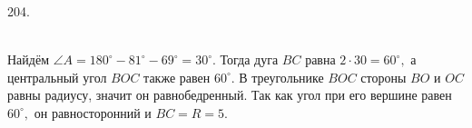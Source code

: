 204. \begin{figure}[ht!]
\end{figure}\\
Найдём $\angle A=180^\circ-81^\circ-69^\circ=30^\circ.$ Тогда дуга $BC$ равна $2\cdot30=60^\circ,$ а центральный угол $BOC$ также равен $60^\circ.$ В треугольнике $BOC$ стороны $BO$ и $OC$ равны радиусу, значит он равнобедренный. Так как угол при его вершине равен $60^\circ,$ он равносторонний и $BC=R=5.$\\
